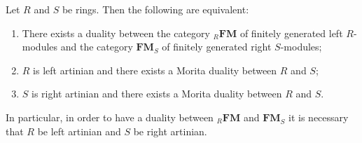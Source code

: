 Let $R$ and $S$ be rings. Then the following are equivalent:

\begin{enumerate}
\item[(a)] There exists a duality between the category ${}_R \mathbf{FM}$ of finitely generated left $R$-modules and the category $\mathbf{FM}_S$ of finitely generated right $S$-modules;
\item[(b)] $R$ is left artinian and there exists a Morita duality between $R$ and $S$;
\item[(c)] $S$ is right artinian and there exists a Morita duality between $R$ and $S$.
\end{enumerate}

In particular, in order to have a duality between ${}_R \mathbf{FM}$ and $\mathbf{FM}_S$ it is necessary that $R$ be left artinian and $S$ be right artinian.
